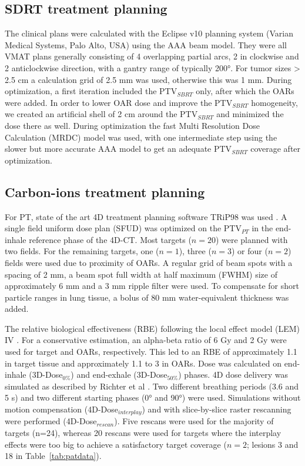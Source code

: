 \documentclass[type=dr, dr=rernat, acm$^3$entcolor=tud7b,colorbacktitle, bigchapter, openright, twoside, 12pt ]{tudthesis}
\begin{document}
\newpage

\subsection{SDRT treatment planning}
\label{SBRTTP}

The clinical plans were calculated with the Eclipse v10 planning system (Varian Medical Systems, Palo Alto, USA) using the AAA beam model. They were all VMAT plans generally consisting of 4 overlapping partial arcs, 2 in clockwise and 2 anticlockwise direction, with a gantry range of typically 200°. For tumor sizes > 2.5 cm a calculation grid of 2.5 mm was used, otherwise this was 1 mm. During optimization, a first iteration included the PTV$_{SBRT}$ only, after which the OARs were added. In order to lower OAR dose and improve the PTV$_{SBRT}$ homogeneity, we created an artificial shell of 2 cm around the PTV$_{SBRT}$ and minimized the dose there as well. During optimization the fast Multi Resolution Dose Calculation (MRDC) model was used, with one intermediate step using the slower but more accurate AAA model to get an adequate PTV$_{SBRT}$ coverage after optimization.


\subsection{Carbon-ions treatment planning}
\label{CiTTP}

For PT, state of the art 4D treatment planning software TRiP98 was used \cite{Richter2013}. A single field uniform dose plan (SFUD) 
was optimized on the PTV$_{PT}$ in the end-inhale reference phase of the 4D-CT. Most targets ($n=20$) were planned with two fields. 
For the remaining targets, one ($n=1$), three ($n=3$) or four ($n=2$) fields were used due to proximity of OARs. 
A regular grid of beam spots with a spacing of 2 mm, a beam spot full width at half maximum (FWHM) size of approximately 6 mm and a 
3 mm ripple filter were used. To compensate for short particle ranges in lung tissue, a bolus of 80 mm water-equivalent thickness 
was added.

The relative biological effectiveness (RBE) following the local effect model (LEM) IV \cite{Elsaesser2010}. 
For a conservative estimation, an alpha-beta ratio of 6 Gy and 2 Gy were used for target and OARs, respectively. 
This led to an RBE of approximately 1.1 in target tissue and approximately 1.1 to 3 in OARs.
Dose was calculated on end-inhale (3D-Dose$_{0\%}$) and end-exhale (3D-Dose$_{50\%}$) phases. 
4D dose delivery was simulated as described by Richter et al \cite{Richter2014}. Two different breathing periods (3.6 and 5 s) 
and two different starting phases (0° and 90°) were used. Simulations without motion compensation (4D-Dose$_{interplay}$)
and with slice-by-slice raster rescanning were performed (4D-Dose$_{rescan}$). Five rescans were used for the majority 
of targets (n=24), whereas 20 rescans were used for targets where the interplay effects were too big to achieve a 
satisfactory target coverage ($n=2$; lesions 3 and 18 in Table~\ref{tab:patdata}). 
\end{document}
